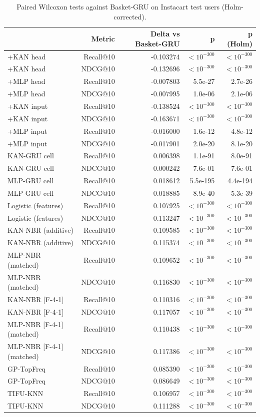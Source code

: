 \begin{table}[H]
\centering\small
\caption{Paired Wilcoxon tests against Basket-GRU on Instacart test users (Holm-corrected).}
\label{tab:sig_instacart}
\begin{tabular}{lrrrr}
\toprule
 & Metric & Delta vs Basket-GRU & p & p (Holm) \\
\midrule
+KAN head & Recall@10 & -0.103274 & $<10^{-300}$ & $<10^{-300}$ \\
+KAN head & NDCG@10 & -0.132696 & $<10^{-300}$ & $<10^{-300}$ \\
+MLP head & Recall@10 & -0.007803 & 5.5e-27 & 2.7e-26 \\
+MLP head & NDCG@10 & -0.007995 & 1.0e-06 & 2.1e-06 \\
+KAN input & Recall@10 & -0.138524 & $<10^{-300}$ & $<10^{-300}$ \\
+KAN input & NDCG@10 & -0.163671 & $<10^{-300}$ & $<10^{-300}$ \\
+MLP input & Recall@10 & -0.016000 & 1.6e-12 & 4.8e-12 \\
+MLP input & NDCG@10 & -0.017901 & 2.0e-20 & 8.1e-20 \\
KAN-GRU cell & Recall@10 & 0.006398 & 1.1e-91 & 8.0e-91 \\
KAN-GRU cell & NDCG@10 & 0.000242 & 7.6e-01 & 7.6e-01 \\
MLP-GRU cell & Recall@10 & 0.018612 & 5.5e-195 & 4.4e-194 \\
MLP-GRU cell & NDCG@10 & 0.018885 & 8.9e-40 & 5.3e-39 \\
Logistic (features) & Recall@10 & 0.107925 & $<10^{-300}$ & $<10^{-300}$ \\
Logistic (features) & NDCG@10 & 0.113247 & $<10^{-300}$ & $<10^{-300}$ \\
KAN-NBR (additive) & Recall@10 & 0.109585 & $<10^{-300}$ & $<10^{-300}$ \\
KAN-NBR (additive) & NDCG@10 & 0.115374 & $<10^{-300}$ & $<10^{-300}$ \\
MLP-NBR (matched) & Recall@10 & 0.109652 & $<10^{-300}$ & $<10^{-300}$ \\
MLP-NBR (matched) & NDCG@10 & 0.116830 & $<10^{-300}$ & $<10^{-300}$ \\
KAN-NBR [F-4-1] & Recall@10 & 0.110316 & $<10^{-300}$ & $<10^{-300}$ \\
KAN-NBR [F-4-1] & NDCG@10 & 0.117057 & $<10^{-300}$ & $<10^{-300}$ \\
MLP-NBR [F-4-1] (matched) & Recall@10 & 0.110438 & $<10^{-300}$ & $<10^{-300}$ \\
MLP-NBR [F-4-1] (matched) & NDCG@10 & 0.117386 & $<10^{-300}$ & $<10^{-300}$ \\
GP-TopFreq & Recall@10 & 0.085390 & $<10^{-300}$ & $<10^{-300}$ \\
GP-TopFreq & NDCG@10 & 0.086649 & $<10^{-300}$ & $<10^{-300}$ \\
TIFU-KNN & Recall@10 & 0.106957 & $<10^{-300}$ & $<10^{-300}$ \\
TIFU-KNN & NDCG@10 & 0.111288 & $<10^{-300}$ & $<10^{-300}$ \\
\bottomrule
\end{tabular}
\end{table}
